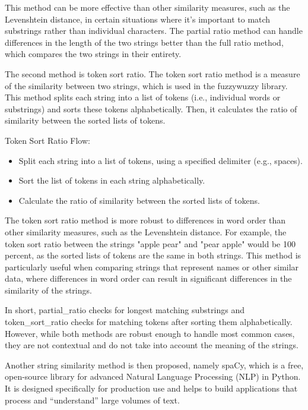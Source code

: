 This method can be more effective than other similarity measures, such as the Levenshtein distance, in certain situations where it's important to match substrings rather than individual characters. The partial ratio method can handle differences in the length of the two strings better than the full ratio method, which compares the two strings in their entirety.

The second method is token sort ratio. The token sort ratio method is a measure of the similarity between two strings, which is used in the fuzzywuzzy library. This method splits each string into a list of tokens (i.e., individual words or substrings) and sorts these tokens alphabetically. Then, it calculates the ratio of similarity between the sorted lists of tokens.

Token Sort Ratio Flow:
\begin{itemize}
  \item Split each string into a list of tokens, using a specified delimiter (e.g., spaces).
  \item Sort the list of tokens in each string alphabetically.
  \item Calculate the ratio of similarity between the sorted lists of tokens.
\end{itemize}

The token sort ratio method is more robust to differences in word order than other similarity measures, such as the Levenshtein distance. For example, the token sort ratio between the strings "apple pear" and "pear apple" would be 100 percent, as the sorted lists of tokens are the same in both strings. This method is particularly useful when comparing strings that represent names or other similar data, where differences in word order can result in significant differences in the similarity of the strings. 

In short, partial\_ratio checks for longest matching substrings and token\_sort\_ratio checks for matching tokens after sorting them alphabetically. However, while both methods are robust enough to handle most common cases, they are not contextual and do not take into account the meaning of the strings.

Another string similarity method is then proposed, namely spaCy, which is a free, open-source library for advanced Natural Language Processing (NLP) in Python. It is designed specifically for production use and helps to build applications that process and “understand” large volumes of text. \label{spacy_similarity}


